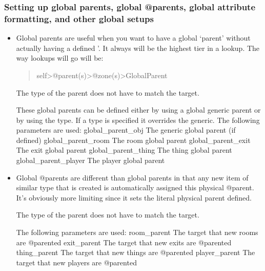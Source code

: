 \documentclass[letterpaper,10pt,english]{sphinxmanual}
\begin{document}
\subsubsection{Setting up global parents, global @parents, global attribute formatting, and other global setups}
\label{\detokenize{features:setting-up-global-parents-global-parents-global-attribute-formatting-and-other-global-setups}}\begin{itemize}
\item {} 
\sphinxAtStartPar
Global parents are useful when you want to have a global ‘parent’
without actually having a defined ’.  It always will be the
highest tier in a lookup.  The way lookups will go will be:
\begin{quote}

\sphinxAtStartPar
self\sphinxhyphen{}\textgreater{}@parent(s)\sphinxhyphen{}\textgreater{}@zone(s)\sphinxhyphen{}\textgreater{}GlobalParent
\end{quote}

\sphinxAtStartPar
The type of the parent does not have to match the target.

\sphinxAtStartPar
These global parents can be defined either by using a global
generic parent or by using the type.  If a type is specified it
overrides the generic.  The following parameters are used:
\sphinxhyphen{} global\_parent\_obj     \sphinxhyphen{} The generic global parent (if defined)
\sphinxhyphen{} global\_parent\_room    \sphinxhyphen{} The room global parent
\sphinxhyphen{} global\_parent\_exit    \sphinxhyphen{} The exit global parent
\sphinxhyphen{} global\_parent\_thing   \sphinxhyphen{} The thing global parent
\sphinxhyphen{} global\_parent\_player  \sphinxhyphen{} The player global parent

\item {} 
\sphinxAtStartPar
Global @parents are different than global parents in that any new
item of similar type that is created is automatically assigned this
physical @parent.  It’s obviously more limiting since it sets
the literal physical parent defined.

\sphinxAtStartPar
The type of the parent does not have to match the target.

\sphinxAtStartPar
The following parameters are used:
\sphinxhyphen{} room\_parent           \sphinxhyphen{} The target that new rooms are @parented
\sphinxhyphen{} exit\_parent           \sphinxhyphen{} The target that new exits are @parented
\sphinxhyphen{} thing\_parent          \sphinxhyphen{} The target that new things are @parented
\sphinxhyphen{} player\_parent         \sphinxhyphen{} The target that new players are @parented


\end{itemize}
\end{document}
